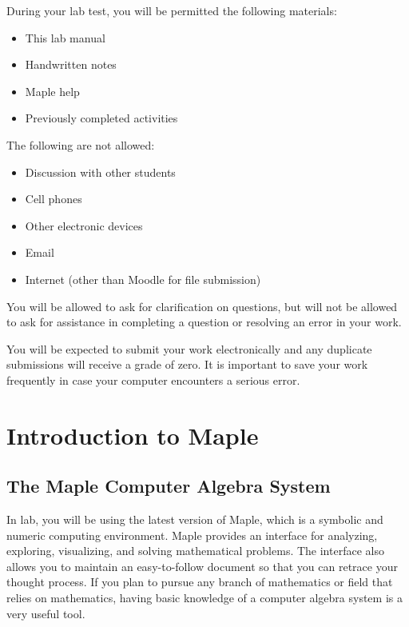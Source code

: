 During your lab test, you will be permitted the following materials:
\vspace*{-1ex}
\begin{multicols}{2}
\begin{itemize}
\item This lab manual
\item Handwritten notes
\item Maple help
\columnbreak
\item Previously completed activities
\vfill\null
\end{itemize}
\end{multicols}
\noindent The following are not allowed:
\vspace*{-1ex}
\begin{multicols}{2}
\begin{itemize}
\item Discussion with other students
\item Cell phones
\item Other electronic devices
\item Email
\item Internet (other than Moodle for file submission)
\vfill\null
\end{itemize}
\end{multicols}
You will be allowed to ask for clarification on questions, but will not be allowed to ask for assistance in completing a question or resolving an error in your work.
\par
You will be expected to submit your work electronically and any duplicate submissions will receive a grade of zero. It is important to save your work frequently in case your computer encounters a serious error.

\chapter{Introduction to Maple}
\label{chp:introduction}

\section{The Maple Computer Algebra System}
\label{sec:the_maple_computer_algebra_system}

In lab, you will be using the latest version of Maple, which is a symbolic and numeric computing environment. Maple provides an interface for analyzing, exploring, visualizing, and solving mathematical problems. The interface also allows you to maintain an easy-to-follow document so that you can retrace your thought process. If you plan to pursue any branch of mathematics or field that relies on mathematics, having basic knowledge of a computer algebra system is a very useful tool.

